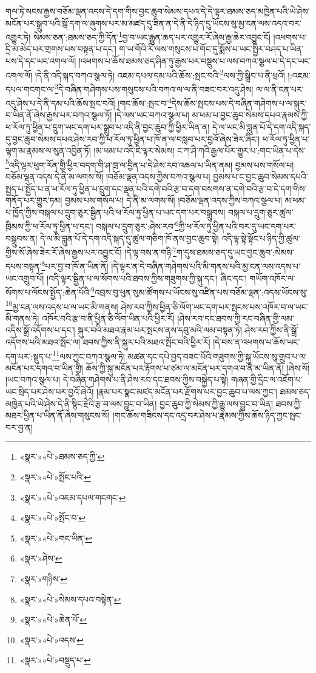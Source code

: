 གལ་ཏེ་སངས་རྒྱས་བཅོམ་ལྡན་འདས་དེ་དག་གིས་བྱང་ཆུབ་སེམས་དཔའ་དེ་དེ་ལྟར་ཐམས་ཅད་མཁྱེན་པའི་ཡེ་ཤེས་མངོན་པར་སྒྲུབ་པའི་སྒོ་དག་ལ་ཞུགས་པར་མ་མཛད་དུ་ཟིན་ན་དེ་ནི་དེ་ཉིད་དུ་ཡོངས་སུ་མྱ་ངན་ལས་འདའ་བར་འགྱུར་ཏེ། སེམས་ཅན་:ཐམས་ཅད་ཀྱི་དོན་\footnote{«སྣར་»«པེ་»ཐམས་ཅད་ཀྱི་}བྱ་བ་ཡང་རྒྱུན་ཆད་པར་འགྱུར་རོ་ཞེས་རྒྱ་ཆེར་འབྱུང་ངོ། །འཕགས་པ་དྲི་མ་མེད་པར་གྲགས་པས་བསྟན་པ་དང་། ག་ཡ་གོའི་རི་ལས་གསུངས་པ་གོང་དུ་སྨོས་པ་ཡང་སྤྱིར་བཤད་པ་ཡིན་པས་དེ་དང་ཡང་འགལ་ལོ། །འཕགས་པ་ཆོས་ཐམས་ཅད་ཤིན་ཏུ་རྒྱས་པར་བསྡུས་པ་ལས་བཀའ་སྩལ་པ་དེ་དང་ཡང་འགལ་ལོ། །དེ་ནི་འདི་སྐད་བཀའ་སྩལ་ཏེ། འཇམ་དཔལ་དམ་པའི་ཆོས་:སྤང་བའི་\footnote{«སྣར་»«པེ་»སྤོང་པའི་}ལས་ཀྱི་སྒྲིབ་པ་ནི་ཕྲའོ། །:འཇམ་དཔལ་གངགང་ལ་\footnote{«སྣར་»«པེ་»འཇམ་དཔལ་གངགང་}དེ་བཞིན་གཤེགས་པས་གསུངས་པའི་བཀའ་ལ་ལ་ནི་བཟང་བར་འདུ་ཤེས། ལ་ལ་ནི་ངན་པར་འདུ་ཤེས་པ་དེ་ནི་དམ་པའི་ཆོས་སྤང་བའོ། །གང་ཆོས་:སྤང་བ་\footnote{«སྣར་»«པེ་»སྤོང་བ་}དེས་ཆོས་སྤངས་པས་དེ་བཞིན་གཤེགས་པ་ལ་སྐུར་བ་ཡིན་ནོ་ཞེས་རྒྱས་པར་བཀའ་སྩལ་ཏོ། །དེ་ལས་ཡང་བཀའ་སྩལ་པ། མ་ཕམ་པ་བྱང་ཆུབ་སེམས་དཔའ་རྣམས་ཀྱི་ཕ་རོལ་ཏུ་ཕྱིན་པ་དྲུག་ཡང་དག་པར་སྒྲུབ་པ་འདི་ནི་བྱང་ཆུབ་ཀྱི་ཕྱིར་ཡིན་ན། དེ་ལ་ཡང་མི་བླུན་པོ་དེ་དག་འདི་སྐད་དུ་བྱང་ཆུབ་སེམས་དཔའ་ཤེས་རབ་ཀྱི་ཕ་རོལ་ཏུ་ཕྱིན་པ་ཁོ་ན་ལ་བསླབ་པར་བྱའོ་ཞེས་ཟེར་ཞིང་། ཕ་རོལ་ཏུ་ཕྱིན་པ་ལྷག་མ་རྣམས་ལ་སུན་འབྱིན་ཏོ། །མ་ཕམ་པ་འདི་ཇི་ལྟར་སེམས། ང་ཀ་ཤི་ཀའི་རྒྱལ་པོར་གྱུར་པ་:གང་ཡིན་པ་དེས་\footnote{«སྣར་»«པེ་»གང་ཡིན་}འདི་ལྟར་ཕུག་རོན་གྱི་ཕྱིར་བདག་གི་ཤ་ཁྲ་ལ་བྱིན་པ་དེ་ཤེས་རབ་འཆལ་པ་ཡིན་ནམ། བྱམས་པས་གསོལ་པ། བཅོམ་ལྡན་འདས་དེ་ནི་མ་ལགས་སོ། །བཅོམ་ལྡན་འདས་ཀྱིས་བཀའ་སྩལ་པ། བྱམས་པ་ང་བྱང་ཆུབ་སེམས་དཔའི་སྤྱད་པ་སྤྱོད་པ་ན་ཕ་རོལ་ཏུ་ཕྱིན་པ་དྲུག་དང་ལྡན་པའི་དགེ་བའི་རྩ་བ་དག་བསགས་ན་དགེ་བའི་རྩ་བ་དེ་དག་གིས་གནོད་པར་གྱུར་ཏམ། བྱམས་པས་གསོལ་པ། དེ་ནི་མ་ལགས་སོ། །བཅོམ་ལྡན་འདས་ཀྱིས་བཀའ་སྩལ་པ། མ་ཕམ་པ་ཁྱོད་ཀྱིས་བསྐལ་པ་དྲུག་ཅུར་སྦྱིན་པའི་ཕ་རོལ་ཏུ་ཕྱིན་པ་ཡང་དག་པར་བསྒྲུབས། བསྐལ་པ་དྲུག་ཅུར་ཚུལ་ཁྲིམས་ཀྱི་ཕ་རོལ་ཏུ་ཕྱིན་པ་དང་། བསྐལ་པ་དྲུག་ཅུར་:ཤེས་རབ་\footnote{«སྣར་»ཤེས་}ཀྱི་ཕ་རོལ་ཏུ་ཕྱིན་པའི་བར་དུ་ཡང་དག་པར་བསྒྲུབས་ན། དེ་ལ་མི་བླུན་པོ་དེ་དག་འདི་སྐད་དུ་ཚུལ་གཅིག་ཁོ་ནས་བྱང་ཆུབ་སྟེ། འདི་ལྟ་སྟེ་སྟོང་པ་ཉིད་ཀྱི་ཚུལ་གྱིས་སོ་ཞེས་ཟེར་རོ་ཞེས་རྒྱས་པར་འབྱུང་ངོ། །དེ་ལྟ་བས་ན་གཉི་\footnote{«སྣར་»གཉིས་}ག་དུས་ཐམས་ཅད་དུ་ཡང་བྱང་ཆུབ་:སེམས་དཔས་བསྟན་\footnote{«སྣར་»«པེ་»སེམས་དཔའ་བསྟེན་}པར་བྱ་བ་ཁོ་ན་ཡིན་ནོ། །དེ་ལྟར་ན་དེ་བཞིན་གཤེགས་པའི་མི་གནས་པའི་མྱ་ངན་ལས་འདས་པ་ཡང་འགྲུབ་པོ། །འདི་ལྟར་སྦྱིན་པ་ལ་སོགས་པའི་ཐབས་ཀྱིས་གཟུགས་ཀྱི་སྐུ་དང་། ཞིང་དང་། གཡོག་འཁོར་ལ་སོགས་པ་ལོངས་སྤྱོད་:ཆེན་པོའི་\footnote{«སྣར་»«པེ་»ཆེན་པོ་}འབྲས་བུ་ཕུན་སུམ་ཚོགས་པ་ཡོངས་སུ་འཛིན་པས་བཅོམ་ལྡན་:འདས་ཡོངས་སུ་\footnote{«སྣར་»«པེ་»འདས་}མྱ་ངན་ལས་འདས་པ་ལ་ཡང་མི་གནས། ཤེས་རབ་ཀྱིས་ཕྱིན་ཅི་ལོག་ཡང་དག་པར་སྤངས་པས་འཁོར་བ་ལ་ཡང་མི་གནས་ཏེ། འཁོར་བའི་རྩ་བ་ནི་ཕྱིན་ཅི་ལོག་ཡིན་པའི་ཕྱིར་རོ། །ཤེས་རབ་དང་ཐབས་ཀྱི་རང་བཞིན་གྱི་ལམ་འདིས་སྒྲོ་འདོགས་པ་དང་། སྐུར་བའི་མཐའ་རྣམ་པར་སྤངས་ནས་དབུ་མའི་ལམ་བསྟན་ཏེ། ཤེས་རབ་ཀྱིས་ནི་སྒྲོ་འདོགས་པའི་མཐའ་སྤོང་ལ། ཐབས་ཀྱིས་ནི་སྐུར་པའི་མཐའ་སྤོང་བའི་ཕྱིར་རོ། །དེ་བས་ན་འཕགས་པ་ཆོས་ཡང་དག་པར་:སྡུད་པ་\footnote{«སྣར་»«པེ་»བསྡུད་པ་}ལས་ཀྱང་བཀའ་སྩལ་ཏེ། མཚན་དང་དཔེ་བྱད་བཟང་པོའི་གཟུགས་ཀྱི་སྐུ་ཡོངས་སུ་གྲུབ་པ་ལ་མངོན་པར་དགའ་བ་ཡིན་གྱི། ཆོས་ཀྱི་སྐུ་མངོན་པར་རྟོགས་པ་ཙམ་ལ་མངོན་པར་དགའ་བ་ནི་མ་ཡིན་ནོ། །ཞེས་སོ། །ཡང་བཀའ་སྩལ་པ། དེ་བཞིན་གཤེགས་པ་ནི་ཤེས་རབ་དང་ཐབས་ཀྱིས་བསྐྱེད་པ་སྟེ། གཞན་གྱི་དྲིང་ལ་འཇོག་པ་ཡང་སྲིད་པར་ཤེས་པར་བྱའོ་ཞེའོ། །རྣམ་པར་སྣང་མཛད་མངོན་པར་རྫོགས་པར་བྱང་ཆུབ་པ་ལས་ཀྱང་། ཐམས་ཅད་མཁྱེན་པའི་ཡེ་ཤེས་དེ་ནི་སྙིང་རྗེའི་རྩ་བ་ལས་བྱུང་བ་ཡིན། བྱང་ཆུབ་ཀྱི་སེམས་ཀྱི་རྒྱུ་ལས་བྱུང་བ་ཡིན། ཐབས་ཀྱི་མཐར་ཕྱིན་པ་ཡིན་ནོ་ཞེས་གསུངས་སོ། །གང་ཆོས་གཟིངས་དང་འདྲ་བར་ཤེས་པ་རྣམས་ཀྱིས་ཆོས་ཉིད་ཀྱང་སྤང་བར་བྱ་ན། 